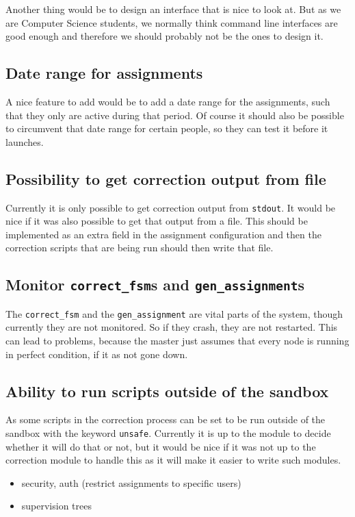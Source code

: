 Another thing would be to design an interface that is nice to look at. But as we
are Computer Science students, we normally think command line interfaces are
good enough and therefore we should probably not be the ones to design it.

\subsection{Date range for assignments}
A nice feature to add would be to add a date range for the assignments, such
that they only are active during that period. Of course it should also be
possible to circumvent that date range for certain people, so they can test it
before it launches.

\subsection{Possibility to get correction output from file}
Currently it is only possible to get correction output from \texttt{stdout}. It
would be nice if it was also possible to get that output from a file. This
should be implemented as an extra field in the assignment configuration and then
the correction scripts that are being run should then write that file.

\subsection{Monitor \texttt{correct\_fsm}s and \texttt{gen\_assignment}s}
The \texttt{correct\_fsm} and the \texttt{gen\_assignment} are vital parts of
the system, though currently they are not monitored. So if they crash, they are
not restarted. This can lead to problems, because the master just assumes that
every node is running in perfect condition, if it as not gone down.

\subsection{Ability to run scripts outside of the sandbox}
As some scripts in the correction process can be set to be run outside of the
sandbox with the keyword \texttt{unsafe}. Currently it is up to the module to
decide whether it will do that or not, but it would be nice if it was not up to
the correction module to handle this as it will make it easier to write such
modules.

\begin{itemize}
    \item security, auth (restrict assignments to specific users)
    \item supervision trees
\end{itemize}

